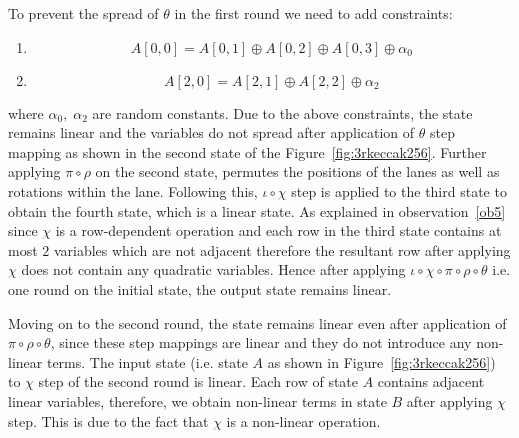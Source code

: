 \noindent To prevent the spread of $\theta$ in the first round we need to add constraints:
\begin{enumerate}
\item \[
        A[0,0] = A[0,1] \oplus A[0,2] \oplus A[0,3] \oplus \alpha_0
    \]
\item \[
        A[2,0] = A[2,1] \oplus A[2,2] \oplus \alpha_2
    \]
\end{enumerate}
where $\alpha_0,\; \alpha_2$ are random constants.
Due to the above constraints, the state remains linear and the variables do not spread after application of $\theta$ step mapping as shown in the second state of the Figure~\ref{fig:3rkeccak256}. 
Further applying $\pi \circ \rho$ on the second state, permutes the positions of the lanes as well as rotations within the lane. 
Following this, $\iota \circ \chi$ step is applied to the third state to obtain the fourth state, which is a linear state. 
As explained in observation~\ref{ob5} since $\chi$ is a row-dependent operation and each row in the third state contains at most $2$ variables which are not adjacent therefore the resultant row after applying $\chi$ does not contain any quadratic variables.
Hence after applying $\iota \circ \chi \circ \pi \circ \rho \circ \theta $ i.e. one round on the initial state, the output state remains linear.

Moving on to the second round, the state remains linear even after application of $\pi \circ \rho \circ \theta$, since these step mappings are linear and they do not introduce any non-linear terms. The input state (i.e. state $A$ as shown in Figure~\ref{fig:3rkeccak256}) to $\chi$ step of the second round is linear. Each row of state $A$ contains adjacent linear variables, therefore, we obtain non-linear terms in state $B$ after applying $\chi$ step. This is due to the fact that $\chi$ is a non-linear operation.



